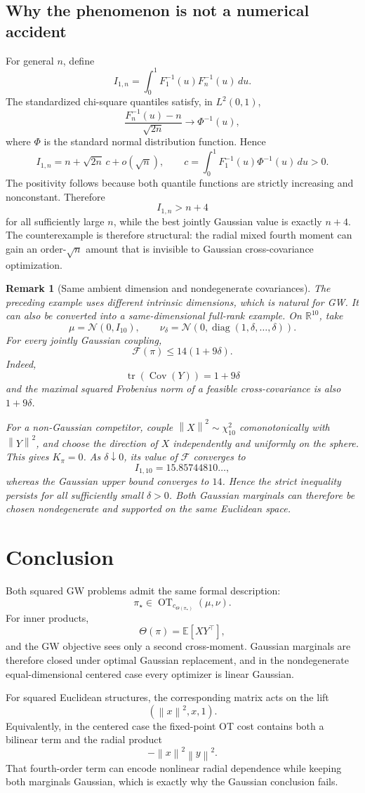 \documentclass[11pt]{article}
\newtheorem{remark}{Remark}
\newcommand{\R}{\mathbb{R}}
\newcommand{\E}{\mathbb{E}}
\newcommand{\cF}{\mathcal{F}}
\newcommand{\norm}[1]{\left\lVert #1\right\rVert}
\newcommand{\tr}{\operatorname{tr}}
\newcommand{\Cov}{\operatorname{Cov}}
\newcommand{\diag}{\operatorname{diag}}
\begin{document}
\subsection{Why the phenomenon is not a numerical accident}

For general $n$, define
\[
I_{1,n}
=
\int_0^1F_1^{-1}(u)F_n^{-1}(u)\,du.
\]
The standardized chi-square quantiles satisfy, in $L^2(0,1)$,
\[
\frac{F_n^{-1}(u)-n}{\sqrt{2n}}
\longrightarrow
\Phi^{-1}(u),
\]
where $\Phi$ is the standard normal distribution function. Hence
\[
I_{1,n}
=
n+\sqrt{2n}\,c+o(\sqrt n),
\qquad
c=
\int_0^1F_1^{-1}(u)\Phi^{-1}(u)\,du>0.
\]
The positivity follows because both quantile functions are strictly
increasing and nonconstant. Therefore
\[
I_{1,n}>n+4
\]
for all sufficiently large $n$, while the best jointly Gaussian value is
exactly $n+4$. The counterexample is therefore structural: the radial
mixed fourth moment can gain an order-$\sqrt n$ amount that is invisible
to Gaussian cross-covariance optimization.

\begin{remark}[Same ambient dimension and nondegenerate covariances]
The preceding example uses different intrinsic dimensions, which is
natural for GW. It can also be converted into a same-dimensional full-rank
example. On $\R^{10}$, take
\[
\mu=\mathcal N(0,I_{10}),
\qquad
\nu_\delta
=
\mathcal N\!\left(
0,\diag(1,\delta,\ldots,\delta)
\right).
\]
For every jointly Gaussian coupling,
\[
\cF(\pi)\leq14(1+9\delta).
\]
Indeed,
\[
\tr(\Cov(Y))=1+9\delta
\]
and the maximal squared Frobenius norm of a feasible cross-covariance is
also $1+9\delta$.

For a non-Gaussian competitor, couple
$\norm{X}^2\sim\chi^2_{10}$ comonotonically with $\norm{Y}^2$, and choose
the direction of $X$ independently and uniformly on the sphere. This gives
$K_\pi=0$. As $\delta\downarrow0$, its value of $\cF$ converges to
\[
I_{1,10}=15.85744810\ldots,
\]
whereas the Gaussian upper bound converges to $14$. Hence the strict
inequality persists for all sufficiently small $\delta>0$. Both Gaussian
marginals can therefore be chosen nondegenerate and supported on the same
Euclidean space.
\end{remark}

\section*{Conclusion}

Both squared GW problems admit the same formal description:
\[
\pi_\star
\in
\operatorname{OT}_{c_{\Theta(\pi_\star)}}(\mu,\nu).
\]
For inner products,
\[
\Theta(\pi)=\E[XY^\top],
\]
and the GW objective sees only a second cross-moment. Gaussian marginals
are therefore closed under optimal Gaussian replacement, and in the
nondegenerate equal-dimensional centered case every optimizer is linear
Gaussian.

For squared Euclidean structures, the corresponding matrix acts on the
lift
\[
(\norm{x}^2,x,1).
\]
Equivalently, in the centered case the fixed-point OT cost contains both a
bilinear term and the radial product
\[
-\norm{x}^2\norm{y}^2.
\]
That fourth-order term can encode nonlinear radial dependence while
keeping both marginals Gaussian, which is exactly why the Gaussian
conclusion fails.
\end{document}
